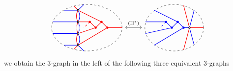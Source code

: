 \[
\begin{tikzcd}
\begin{tikzpicture}[baseline=-.5ex,scale=0.6]
\draw[dashed] \boundellipse{0.75,0}{3}{2};
\draw[blue, thick](-1.2,1.5) -- (0,1.5) (-2.15,0.5) -- (0,0.5) (-2.15,-0.5) -- (0,-0.5) (-1.2,-1.5) -- (0,-1.5);
\draw[blue, thick] (0.5,2) --  (0,1.5) to[out=-60,in=60] (0,0.5) to[out=-60,in=100] (0.1,0.2) (0.1,-0.2) to[out=-100,in=60] (0,-0.5) to[out=-60,in=60] (0,-1.5) -- (0.5,-2);
\draw[blue, thick, densely dotted] (0.1, 0.2) -- (0.1, -0.2);
\draw[red, thick] (-0.35,1.85) --  (0,1.5) to[out=-120,in=120] (0,0.5) to[out=-120,in=80] (-0.1,0.2) (-0.1,-0.2) to[out=-80,in=120] (0,-0.5) to[out=-120,in=120] (0,-1.5) -- (-0.35,-1.85);
\draw[red, thick, densely dotted] (-0.1, 0.2) -- (-0.1, -0.2);
\draw[red, thick, fill] (3.75,0) -- (2.5,0) circle (2pt) -- (0,-1.5) (2.5,0) -- (2, 0.5) circle (2pt) -- (0,1.5) (2,0.5) -- (1.5,0) circle (2pt) -- (0,-0.5) (1.5,0) -- (1, 0.5) circle (2pt) -- (0,0.5);
\draw[red, thick, dashed] (1,0.5) -- (0.5,0);
\draw[fill=white, thick] (0,1.5) circle (2pt) (0,0.5) circle (2pt) (0,-0.5) circle (2pt) (0,-1.5) circle (2pt);
\end{tikzpicture}
\arrow[leftrightarrow, r,"\Move{II^*}"]&
\begin{tikzpicture}[baseline=-.5ex,scale=0.6]
\draw[dashed] \boundellipse{1.7,0}{2.5}{2};
\draw[blue, thick, fill] (3,0) -- (2.5,0) circle (2pt) -- (0,-1.5) (2.5,0) -- (2, 0.5) circle (2pt) -- (0,1.5) (2,0.5) -- (1.5,0) circle (2pt) -- (-0.75,-0.5) (1.5,0) -- (1, 0.5) circle (2pt) -- (-0.75,0.5);
\draw[blue, thick, dashed] (1,0.5) -- (0.5,0);
\draw[blue, thick] (3.4,1.5) -- (3,0) -- (3.4,-1.5);
\draw[red, thick] (2.5,1.9) -- (3,0) -- (2.5,-1.9) (3,0) -- (4.2,0);
\draw[fill=white, thick] (3,0) circle (2pt);
\end{tikzpicture}
\end{tikzcd}
\]
we obtain the $3$-graph in the left of the following three equivalent $3$-graphs
